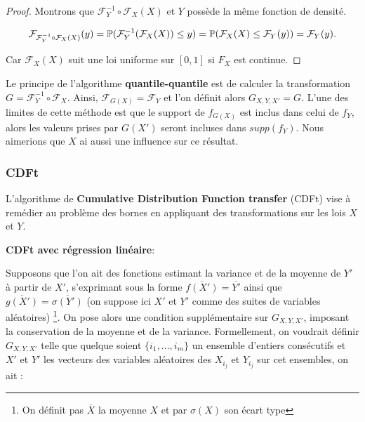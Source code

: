 \documentclass[a4paper,10pt]{article}
\begin{document}
\begin{proof}
	Montrons que $\mathcal{F}^{-1}_Y \circ \mathcal{F}_X(X)$ et $Y$ possède la même fonction de densité. 
	
	
	\begin{equation}
		\mathcal{F}_{\mathcal{F}^{-1}_Y \circ \mathcal{F}_X(X)}(y)= \mathbb{P}(\mathcal{F}^{-1}_Y (\mathcal{F}_X(X))\leq y )\\
		= \mathbb{P}(\mathcal{F}_{X}(X) \leq \mathcal{F}_Y(y))\\
		= \mathcal{F}_Y(y).
	\end{equation}
	
	Car $\mathcal{F}_{X}(X)$ suit une loi uniforme sur $[0,1]$ si $F_X$ est continue.
	
\end{proof}
Le principe de l'algorithme \textbf{quantile-quantile} est de calculer la transformation $G=\mathcal{F}^{-1}_{Y} \circ \mathcal{F}_{X}$. Ainsi, $\mathcal{F}_{G(X)}=\mathcal{F}_{Y}$ et l'on définit alors $G_{X,Y,X'}=G$. L'une des limites de cette méthode est que le support de $f_{G(X)}$ est inclus dans celui de $f_{Y}$, alors les valeurs prises par $G(X')$ seront incluses dans $supp(f_Y)$. Nous aimerions que $X$ ai aussi une influence sur ce résultat.

\subsubsection{CDFt}

L'algorithme de \textbf{Cumulative Distribution Function transfer} (CDFt) vise à remédier au problème des bornes en appliquant des transformations sur les lois $X$ et $Y$.

\noindent \textbf{CDFt avec régression linéaire}:

Supposons que l'on ait des fonctions estimant la variance et de la moyenne de $Y'$ à partir de $X'$, s'exprimant sous la forme $\overline{f(X')} = \overline{Y'}$ ainsi que $\overline{g(X')} = \overline{\sigma(Y')}$ (on suppose ici $X'$ et $Y'$ comme des suites de variables aléatoires) \footnote{On définit pas $\overline{X}$ la  moyenne $X$ et par $\sigma(X)$ son écart type}.  
On pose alors une condition supplémentaire sur $G_{X,Y,X'}$, imposant la conservation de la moyenne et de la variance. Formellement, on voudrait définir $G_{X,Y,X'}$ telle que quelque soient $\{i_1,...,i_m\}$ un ensemble d'entiers consécutifs et $X'$ et $Y'$ les vecteurs des variables aléatoires des $X_{i_j}$ et $Y_{i_j}$ sur cet ensembles, on ait :
\end{document}
